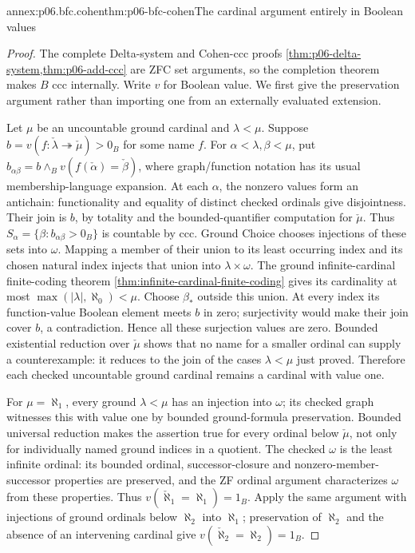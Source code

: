 \begin{annexitem}{annex:p06.bfc.cohen}{thm:p06-bfc-cohen}{The cardinal argument entirely in Boolean values}
\begin{proof}
The complete Delta-system and Cohen-ccc proofs
\cref{thm:p06-delta-system,thm:p06-add-ccc} are ZFC set arguments, so
the completion theorem makes \(B\) ccc internally. Write \(v\) for
Boolean value. We first give the preservation argument rather than importing
one from an externally evaluated extension.

Let \(\mu\) be an uncountable ground cardinal and \(\lambda<\mu\).
Suppose \(b=v(f:\check\lambda\twoheadrightarrow\check\mu)>0_B\)
for some name \(f\). For \(\alpha<\lambda,\beta<\mu\), put
\(b_{\alpha\beta}=b\wedge_B v(f(\check\alpha)=\check\beta)\),
where graph/function notation has its usual membership-language expansion.
At each \(\alpha\), the nonzero values form an antichain: functionality
and equality of distinct checked ordinals give disjointness. Their join
is \(b\), by totality and the bounded-quantifier computation for
\(\check\mu\). Thus
\(S_\alpha=\{\beta:b_{\alpha\beta}>0_B\}\) is countable by ccc.
Ground Choice chooses injections of these sets into \(\omega\).
Mapping a member of their union to its least occurring index and its
chosen natural index injects that union into \(\lambda\times\omega\).
The ground infinite-cardinal finite-coding theorem
\cref{thm:infinite-cardinal-finite-coding} gives its cardinality
at most \(\max(|\lambda|,\aleph_0)<\mu\).
Choose \(\beta_*\) outside this union. At every index its function-value
Boolean element meets \(b\) in zero; surjectivity would make their join
cover \(b\), a contradiction. Hence all these surjection values are zero.
Bounded existential reduction over \(\check\mu\) shows that no name
for a smaller ordinal can supply a counterexample: it reduces to the
join of the cases \(\lambda<\mu\) just proved. Therefore each checked
uncountable ground cardinal remains a cardinal with value one.

For \(\mu=\aleph_1\), every ground \(\lambda<\mu\) has an injection
into \(\omega\); its checked graph witnesses this with value one by
bounded ground-formula preservation. Bounded universal reduction makes
the assertion true for every ordinal below \(\check\mu\), not only
for individually named ground indices in a quotient. The checked
\(\omega\) is the least infinite ordinal: its bounded ordinal,
successor-closure and nonzero-member-successor properties are preserved,
and the ZF ordinal argument characterizes \(\omega\) from these properties.
Thus \(v(\check\aleph_1=\aleph_1)=1_B\).
Apply the same argument with injections of ground ordinals below
\(\aleph_2\) into \(\aleph_1\); preservation of \(\aleph_2\) and
the absence of an intervening cardinal give
\(v(\check\aleph_2=\aleph_2)=1_B\).


\end{proof}
\end{annexitem}
